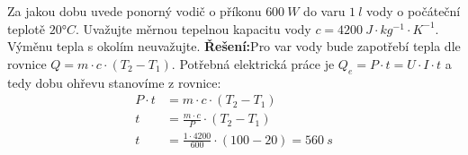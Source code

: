 \begin{example}
  Za jakou dobu uvede ponorný vodič o příkonu $600\ W$ do varu $1\ l$ vody o počáteční teplotě 
  $20°C$. Uvažujte měrnou tepelnou kapacitu vody $c = 4200\ J\cdot kg^{-1}\cdot K^{-1}$. Výměnu 
  tepla s okolím neuvažujte. \newline 
  \textbf{Řešení:}\newline Pro var vody bude zapotřebí tepla dle rovnice $Q  = m\cdot c\cdot(T_2 - 
  T_1)$. Potřebná elektrická práce je $Q_e = P\cdot t = U\cdot I\cdot t$ a tedy dobu ohřevu 
  stanovíme z rovnice:
  \begin{align*}
  P\cdot t &= m\cdot c\cdot(T_2 - T_1)               \nonumber  \\
  t &= \frac{m\cdot c}{P}\cdot(T_2 - T_1)     \nonumber  \\
  t &= \frac{1\cdot 4200}{600}\cdot(100 - 20) = 560\ s
  \end{align*}         
\end{example}